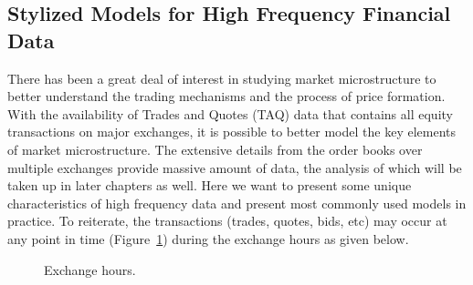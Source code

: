 \subsection{Stylized Models for High Frequency Financial Data} \label{in:style7}

There has been a great deal of interest in studying market microstructure to better understand the trading mechanisms and the process of price formation. With the availability of Trades and Quotes (TAQ)\label{in:taq2} data that contains all equity transactions on major exchanges, it is possible to better model the key elements of market microstructure. The extensive details from the order books over multiple exchanges provide massive amount of data, the analysis of which will be taken up in later chapters as well. Here we want to present some unique characteristics of high frequency data and present most commonly used models in practice. To reiterate, the transactions (trades, quotes, bids, etc) may occur at any point in time (Figure~\ref{fig:exchhours}) during the exchange hours as given below.

	\begin{figure}[!ht]
	\centering
	\caption{Exchange hours.\label{fig:exchhours}}
	\end{figure}

